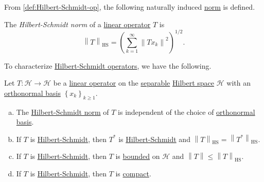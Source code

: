 From \autoref{def:Hilbert-Schmidt-op}, the following naturally induced \hyperref[def:norm]{norm} is defined.

\begin{definition}\label{def:Hilbert-Schmidt-norm}
	The \emph{Hilbert-Schmidt norm} of a \hyperref[def:linear-map]{linear operator} \(T\) is
	\[
		\left\lVert T\right\rVert _{\mathrm{HS} } = \left( \sum_{k=1}^{\infty} \left\lVert T x_{k} \right\rVert ^2 \right) ^{1 / 2}.
	\]
\end{definition}

To characterize \hyperref[def:Hilbert-Schmidt-op]{Hilbert-Schmidt operators}, we have the following.

\begin{proposition}
	Let \(T\colon \mathcal{H} \to \mathcal{H} \) be a \hyperref[def:linear-op]{linear operator} on the \hyperref[def:separable]{separable} \hyperref[def:Hilbert-space]{Hilbert space} \(\mathcal{H} \) with an \hyperref[def:orthonormal-basis]{orthonormal basis} \(\left\{ x_k \right\}_{k\geq 1} \).
	\begin{enumerate}[(a)]
		\item The \hyperref[def:Hilbert-Schmidt-norm]{Hilbert-Schmidt norm} of \(T\) is independent of the choice of \hyperref[def:orthonormal-basis]{orthonormal basis}.
		\item If \(T\) is \hyperref[def:Hilbert-Schmidt-op]{Hilbert-Schmidt}, then \(T^{\ast} \) is \hyperref[def:Hilbert-Schmidt-op]{Hilbert-Schmidt} and \(\left\lVert T\right\rVert _{\mathrm{HS} } = \left\lVert T^{\ast} \right\rVert _{\mathrm{HS} } \).
		\item If \(T\) is \hyperref[def:Hilbert-Schmidt-op]{Hilbert-Schmidt}, then \(T\) is \hyperref[def:bounded-linear-op]{bounded} on \(\mathcal{H} \) and \(\left\lVert T\right\rVert \leq \left\lVert T\right\rVert _{\mathrm{HS} }\).
		\item If \(T\) is \hyperref[def:Hilbert-Schmidt-op]{Hilbert-Schmidt}, then \(T\) is \hyperref[def:compact-op]{compact}.
	\end{enumerate}
\end{proposition}

